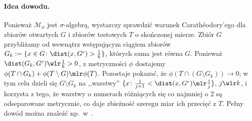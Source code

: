 \paragraph{Idea dowodu.}
Ponieważ $\mathcal{M}_\phi$ jest $\sigma$-algebrą, wystarczy sprawdzić warunek Carathéodory'ego dla zbiorów otwartych $G$ i zbiorów testowych $T$ o skończonej mierze. Zbiór $G$ przybliżamy od wewnątrz wstępującym ciągiem zbiorów $G_k := \{x \in G \colon \dist(x, G^c) > \frac{1}{k}\}$, których suma jest równa $G$. Ponieważ $\dist(G_k, G^c) \wlr \frac{1}{k} > 0$, z metryczności $\phi$ dostajemy $\phi(T \cap G_k) + \phi(T \setminus G) \mlr \phi(T)$. Pozostaje pokazać, że $\phi(T \cap (G \setminus G_k)) \to 0$; w tym celu dzieli się $G \setminus G_k$ na ,,warstwy'' $\{x \colon \frac{1}{j+1} < \dist(x, G^c) \mlr \frac{1}{j}\}$, $j \wlr k$, i korzysta z tego, że warstwy o numerach różniących się co najmniej o $2$ są odseparowane metrycznie, co daje zbieżność szeregu miar ich przecięć z $T$. Pełny dowód można znaleźć np.\ w~\cite{Plebanek}.


